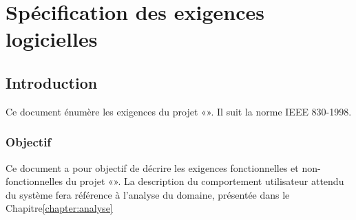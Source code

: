 
\chapter{Spécification des exigences logicielles}\label{chapter:exigences}


\section{Introduction}

Ce document énumère les exigences du projet «\projet{}». Il suit la norme IEEE 830-1998.


\subsection{Objectif}
Ce document a pour objectif de décrire les exigences fonctionnelles et non-fonctionnelles du projet «\projet».
La description du comportement utilisateur attendu du système fera référence à l'analyse du domaine, présentée dans le Chapitre\ref{chapter:analyse}

